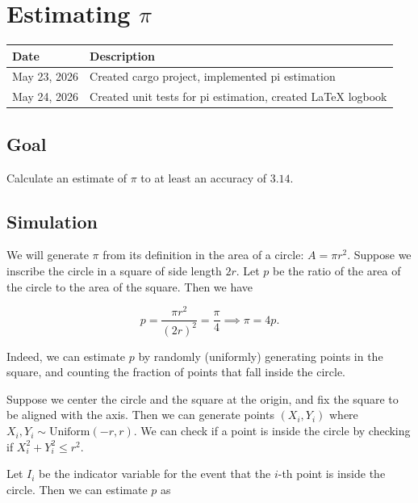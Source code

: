 \section{Estimating $\pi$}

\begin{center}
    \begin{tabular}{|l|p{10cm}|}
        \hline
        \textbf{Date} & \textbf{Description}                                 \\
        \hline
        May 23, 2026  & Created cargo project, implemented pi estimation     \\
        \hline
        May 24, 2026  & Created unit tests for pi estimation, created \LaTeX
        logbook                                                              \\
        \hline
    \end{tabular}
\end{center}

\subsection{Goal}

Calculate an estimate of $\pi$ to at least an accuracy of $3.14$.

\subsection{Simulation}

We will generate $\pi$ from its definition in the area of a circle:
$A = \pi r^2$. Suppose we inscribe the circle in a square of side length $2r$.
Let $p$ be the ratio of the area of the circle to the area of the square. Then
we have

\[
    p = \frac{\pi r^2}{(2r)^2} = \frac{\pi}{4} \implies \pi = 4p.
\]

Indeed, we can estimate $p$ by randomly (uniformly) generating points in the
square, and counting the fraction of points that fall inside the circle.

Suppose we center the circle and the square at the origin, and fix the square to
be aligned with the axis. Then we can generate points $(X_i, Y_i)$ where
$X_i, Y_i \sim \text{Uniform}(-r, r)$. We can check if a point is inside the
circle by checking if $X_i^2 + Y_i^2 \leq r^2$.

Let $I_i$ be the indicator variable for the event that the $i$-th point is
inside the circle. Then we can estimate $p$ as

